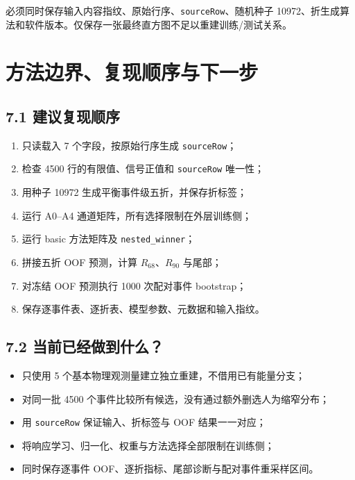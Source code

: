 \documentclass[UTF8,11pt,a4paper,oneside,fontset=none]{ctexart}
\newcommand{\Rsixtyeight}{R_{68}}
\newcommand{\Rninty}{R_{90}}
\begin{document}
\begin{infobox}[title={可复现性的最小条件},fonttitle=\bfseries]
必须同时保存输入内容指纹、原始行序、\texttt{sourceRow}、随机种子 10972、折生成算法和软件版本。仅保存一张最终直方图不足以重建训练/测试关系。
\end{infobox}
\clearpage

\section{方法边界、复现顺序与下一步}

\subsection*{7.1 建议复现顺序}

\begin{enumerate}
  \item 只读载入 7 个字段，按原始行序生成 \texttt{sourceRow}；
  \item 检查 4500 行的有限值、信号正值和 \texttt{sourceRow} 唯一性；
  \item 用种子 10972 生成平衡事件级五折，并保存折标签；
  \item 运行 A0--A4 通道矩阵，所有选择限制在外层训练侧；
  \item 运行 basic 方法矩阵及 \texttt{nested\_winner}；
  \item 拼接五折 OOF 预测，计算 $\Rsixtyeight$、$\Rninty$ 与尾部；
  \item 对冻结 OOF 预测执行 1000 次配对事件 bootstrap；
  \item 保存逐事件表、逐折表、模型参数、元数据和输入指纹。
\end{enumerate}

\subsection*{7.2 当前已经做到什么？}

\begin{methodbox}[title={已建立的处理链},fonttitle=\bfseries]
\begin{itemize}
  \item 只使用 5 个基本物理观测量建立独立重建，不借用已有能量分支；
  \item 对同一批 4500 个事件比较所有候选，没有通过额外删选人为缩窄分布；
  \item 用 \texttt{sourceRow} 保证输入、折标签与 OOF 结果一一对应；
  \item 将响应学习、归一化、权重与方法选择全部限制在训练侧；
  \item 同时保存逐事件 OOF、逐折指标、尾部诊断与配对事件重采样区间。
\end{itemize}
\end{methodbox}
\end{document}
